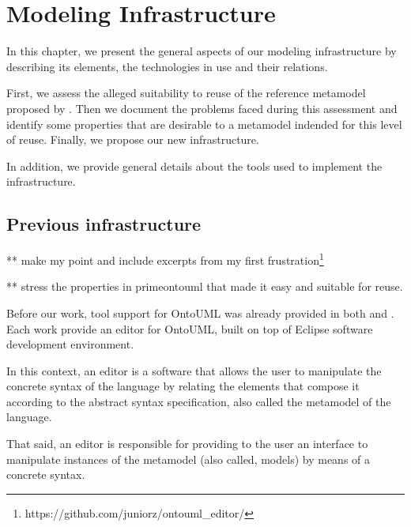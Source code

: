 \documentclass[
  10pt,				%
  oneside,
  a4paper,			%
  brazilian,
  english
]{abntex2}
\begin{document}
\chapter{Modeling Infrastructure}


In this chapter, we present the general aspects of our modeling infrastructure by
describing its elements, the technologies in use and their relations.

First, we assess the alleged suitability to reuse of the reference metamodel
proposed by \cite{carraretto10}.
%
%
Then we document the problems faced during this assessment and identify some
properties that are desirable to a metamodel indended for this level of reuse.
Finally, we propose our new infrastructure.

In addition, we provide general details about the tools used to implement the infrastructure.

\section{Previous infrastructure}

** make my point and include excerpts from my first frustration\footnote{https://github.com/juniorz/ontouml\_editor/}

** stress the properties in primeontouml that made it easy and suitable for reuse.

Before our work, tool support for OntoUML was already provided in both
\cite{benevides10} and \cite{carraretto10}. Each work provide an editor for
OntoUML, built on top of Eclipse software development environment.

In this context, an editor is a software that allows the user to manipulate the
concrete syntax of the language by relating the elements that compose it
according to the abstract syntax specification,
also called the metamodel of the language.

That said, an editor is responsible for providing to the user an interface to
manipulate instances of the metamodel (also called, models) by means of a
concrete syntax.
\end{document}
